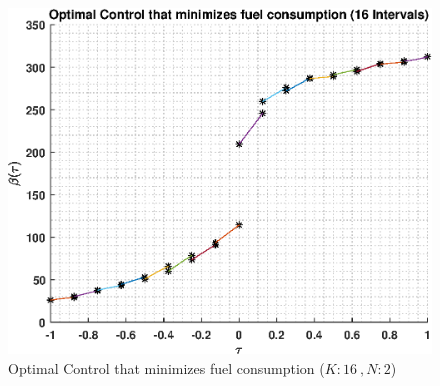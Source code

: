 \documentclass[]{article}
\begin{document}
\begin{figure}
	\centering
	\includegraphics[scale=0.75]{directControlK16Poly2.eps}
	\caption{Optimal Control that minimizes fuel consumption (\(K:16\ , N:2\))}
	\label{fig:directControlK16Poly2}
\end{figure}
\FloatBarrier
\end{document}
